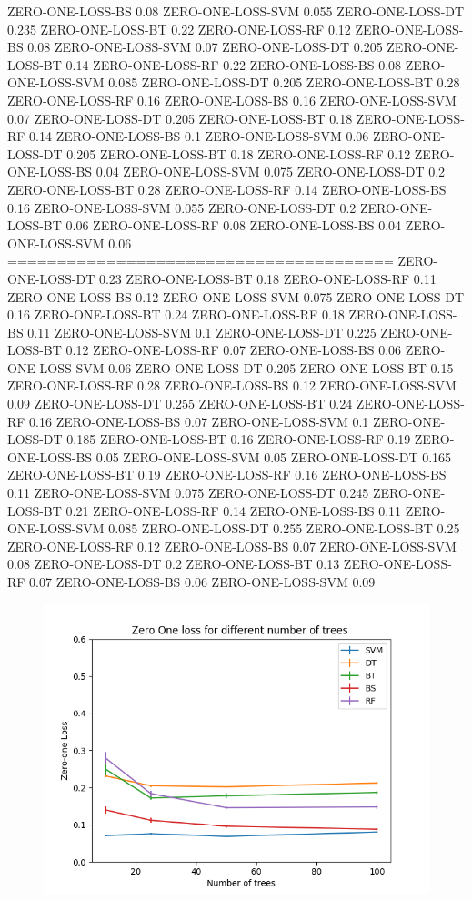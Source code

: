 \documentclass[12pt]{article}
\begin{document}
ZERO-ONE-LOSS-BS 0.08
ZERO-ONE-LOSS-SVM 0.055
ZERO-ONE-LOSS-DT 0.235
ZERO-ONE-LOSS-BT 0.22
ZERO-ONE-LOSS-RF 0.12
ZERO-ONE-LOSS-BS 0.08
ZERO-ONE-LOSS-SVM 0.07
ZERO-ONE-LOSS-DT 0.205
ZERO-ONE-LOSS-BT 0.14
ZERO-ONE-LOSS-RF 0.22
ZERO-ONE-LOSS-BS 0.08
ZERO-ONE-LOSS-SVM 0.085
ZERO-ONE-LOSS-DT 0.205
ZERO-ONE-LOSS-BT 0.28
ZERO-ONE-LOSS-RF 0.16
ZERO-ONE-LOSS-BS 0.16
ZERO-ONE-LOSS-SVM 0.07
ZERO-ONE-LOSS-DT 0.205
ZERO-ONE-LOSS-BT 0.18
ZERO-ONE-LOSS-RF 0.14
ZERO-ONE-LOSS-BS 0.1
ZERO-ONE-LOSS-SVM 0.06
ZERO-ONE-LOSS-DT 0.205
ZERO-ONE-LOSS-BT 0.18
ZERO-ONE-LOSS-RF 0.12
ZERO-ONE-LOSS-BS 0.04
ZERO-ONE-LOSS-SVM 0.075
ZERO-ONE-LOSS-DT 0.2
ZERO-ONE-LOSS-BT 0.28
ZERO-ONE-LOSS-RF 0.14
ZERO-ONE-LOSS-BS 0.16
ZERO-ONE-LOSS-SVM 0.055
ZERO-ONE-LOSS-DT 0.2
ZERO-ONE-LOSS-BT 0.06
ZERO-ONE-LOSS-RF 0.08
ZERO-ONE-LOSS-BS 0.04
ZERO-ONE-LOSS-SVM 0.06
=======================================
ZERO-ONE-LOSS-DT 0.23
ZERO-ONE-LOSS-BT 0.18
ZERO-ONE-LOSS-RF 0.11
ZERO-ONE-LOSS-BS 0.12
ZERO-ONE-LOSS-SVM 0.075
ZERO-ONE-LOSS-DT 0.16
ZERO-ONE-LOSS-BT 0.24
ZERO-ONE-LOSS-RF 0.18
ZERO-ONE-LOSS-BS 0.11
ZERO-ONE-LOSS-SVM 0.1
ZERO-ONE-LOSS-DT 0.225
ZERO-ONE-LOSS-BT 0.12
ZERO-ONE-LOSS-RF 0.07
ZERO-ONE-LOSS-BS 0.06
ZERO-ONE-LOSS-SVM 0.06
ZERO-ONE-LOSS-DT 0.205
ZERO-ONE-LOSS-BT 0.15
ZERO-ONE-LOSS-RF 0.28
ZERO-ONE-LOSS-BS 0.12
ZERO-ONE-LOSS-SVM 0.09
ZERO-ONE-LOSS-DT 0.255
ZERO-ONE-LOSS-BT 0.24
ZERO-ONE-LOSS-RF 0.16
ZERO-ONE-LOSS-BS 0.07
ZERO-ONE-LOSS-SVM 0.1
ZERO-ONE-LOSS-DT 0.185
ZERO-ONE-LOSS-BT 0.16
ZERO-ONE-LOSS-RF 0.19
ZERO-ONE-LOSS-BS 0.05
ZERO-ONE-LOSS-SVM 0.05
ZERO-ONE-LOSS-DT 0.165
ZERO-ONE-LOSS-BT 0.19
ZERO-ONE-LOSS-RF 0.16
ZERO-ONE-LOSS-BS 0.11
ZERO-ONE-LOSS-SVM 0.075
ZERO-ONE-LOSS-DT 0.245
ZERO-ONE-LOSS-BT 0.21
ZERO-ONE-LOSS-RF 0.14
ZERO-ONE-LOSS-BS 0.11
ZERO-ONE-LOSS-SVM 0.085
ZERO-ONE-LOSS-DT 0.255
ZERO-ONE-LOSS-BT 0.25
ZERO-ONE-LOSS-RF 0.12
ZERO-ONE-LOSS-BS 0.07
ZERO-ONE-LOSS-SVM 0.08
ZERO-ONE-LOSS-DT 0.2
ZERO-ONE-LOSS-BT 0.13
ZERO-ONE-LOSS-RF 0.07
ZERO-ONE-LOSS-BS 0.06
ZERO-ONE-LOSS-SVM 0.09

\begin{figure}
	\centering
	\includegraphics{Analysis4.png}
\end{figure}
\end{document}
